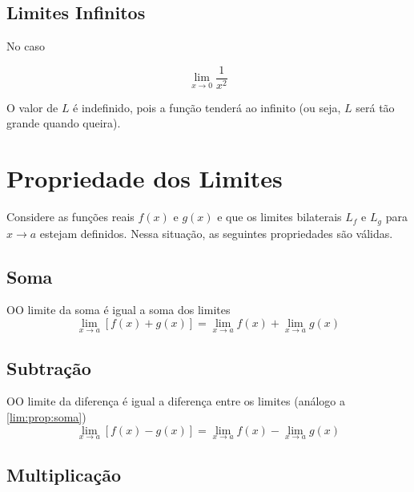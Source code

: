 \subsection{Limites Infinitos}

No caso

\begin{equation*}
\lim_{x\to 0} \frac{1}{x^{2}}
\end{equation*}

O valor de $L$ é indefinido, pois a função tenderá ao infinito (ou seja, $L$ será tão grande quando queira).

\section{Propriedade dos Limites}%

Considere as funções reais $f(x)$ e $g(x)$ e que os limites bilaterais $L_{f}$ e $L_{g}$ para $x\to a$ estejam definidos. Nessa situação, as seguintes propriedades são válidas.

\subsection{Soma}%
\vspace{0.3cm}
\begin{defin}
  OO limite da soma é igual a soma dos limites
  \begin{equation}
    \lim_{x\to a} [f(x) + g(x)] = \lim_{x\to a} f(x) + \lim_{x\to a} g(x)
  \end{equation}
\label{lim:prop:soma}
\end{defin}

\subsection{Subtração}
\vspace{0.3cm}

\begin{defin}
  OO limite da diferença é igual a diferença entre os limites (análogo a \ref{lim:prop:soma})
 \begin{equation}
    \lim_{x\to a} [f(x) - g(x)] = \lim_{x\to a} f(x) - \lim_{x\to a} g(x)
 \end{equation}
\label{lim:prop:diff}
\end{defin}

\subsection{Multiplicação}
\vspace{0.3cm}


